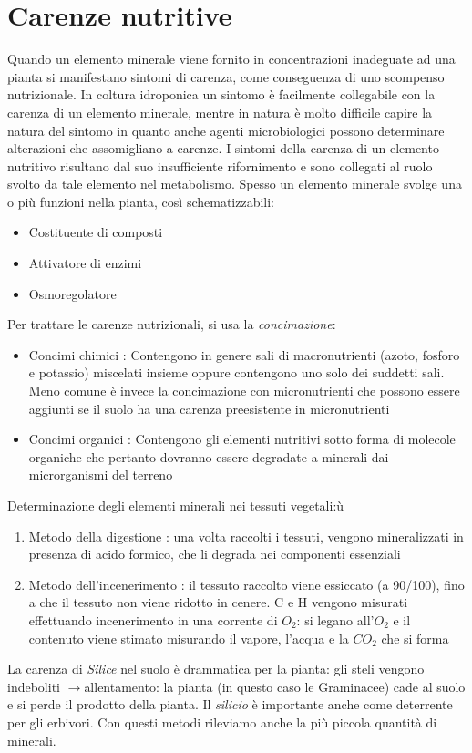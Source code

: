 \documentclass[a4paper,12pt]{book}
\newcommand{\freccia}{\ensuremath{\rightarrow}}
\begin{document}
\section{Carenze nutritive}
Quando un elemento minerale viene fornito in concentrazioni inadeguate ad una
pianta si manifestano sintomi di carenza, come conseguenza di uno scompenso
nutrizionale. In coltura idroponica un sintomo è facilmente collegabile con la
carenza di un elemento minerale, mentre in natura è molto difficile capire la natura
del sintomo in quanto anche agenti microbiologici possono determinare alterazioni
che assomigliano a carenze.
I sintomi della carenza di un elemento nutritivo risultano dal suo insufficiente
rifornimento e sono collegati al ruolo svolto da tale elemento nel metabolismo.
Spesso un elemento minerale svolge una o più funzioni nella pianta, così
schematizzabili:
\begin{itemize}
\item{Costituente di composti}
\item{Attivatore di enzimi}
\item{Osmoregolatore}
\end{itemize}

Per trattare le carenze nutrizionali, si usa la \emph{concimazione}:
\begin{itemize}
\item{Concimi chimici : Contengono in genere sali di macronutrienti (azoto,
fosforo e potassio) miscelati insieme oppure contengono uno solo dei
suddetti sali. Meno comune è invece la concimazione con micronutrienti
che possono essere aggiunti se il suolo ha una carenza preesistente in
micronutrienti}
\item{Concimi organici : Contengono gli elementi nutritivi sotto forma di
molecole organiche che pertanto dovranno essere degradate a minerali dai
microrganismi del terreno}
\end{itemize}

Determinazione degli elementi minerali nei tessuti vegetali:ù
\begin{enumerate}
\item{Metodo della digestione : una volta raccolti i tessuti, vengono mineralizzati in presenza di acido formico, che li degrada nei componenti essenziali}
\item{Metodo dell'incenerimento : il tessuto raccolto viene essiccato (a 90/100\textcelsius), fino a che il tessuto non viene ridotto in cenere. C e H vengono misurati effettuando incenerimento in una corrente di $O_{2}$: si legano all'$O_{2}$ e il contenuto viene stimato misurando il vapore, l'acqua e la $CO_{2}$ che si forma}
\end{enumerate}
La carenza di \emph{Silice} nel suolo è drammatica per la pianta: gli steli vengono indeboliti \freccia allentamento: la pianta (in questo caso le Graminacee) cade al suolo e si perde il prodotto della pianta. Il \emph{silicio} è importante anche come deterrente per gli erbivori.
Con questi metodi rileviamo anche la più piccola quantità di minerali.
 
\end{document}
